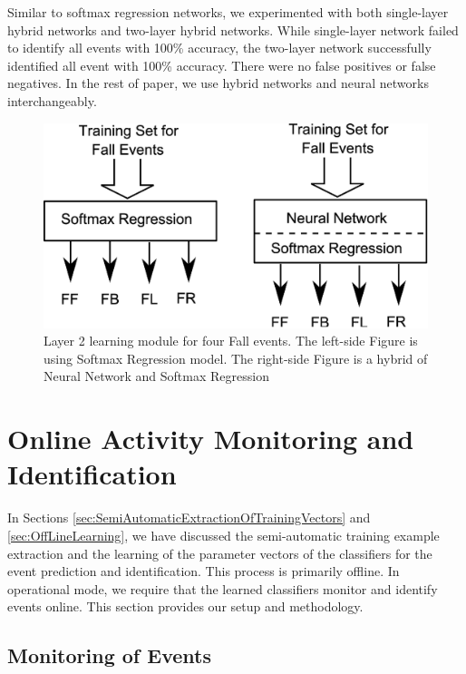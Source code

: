 \documentclass[]{IEEEtran}
\begin{document}
Similar to softmax regression networks, we experimented  with both single-layer
hybrid networks and two-layer hybrid networks. While single-layer network
failed to identify all events with 100\% accuracy, the two-layer network
successfully identified all event with 100\% accuracy. There were no false
positives or false negatives. In the rest of paper, we use hybrid networks and
neural networks interchangeably.

\begin{figure}[t]
	\centering
		\includegraphics[width=0.7\columnwidth]{figures/SoftmaxLayer2Fall.eps}
	\caption{Layer 2 learning module for four Fall events. The left-side
Figure is using Softmax Regression model. The right-side Figure is a hybrid of
Neural Network and Softmax Regression } \label{fig:SoftmaxLayer2Fall}
\end{figure}


\section{Online Activity Monitoring and Identification}

In Sections \ref{sec:SemiAutomaticExtractionOfTrainingVectors} and
\ref{sec:OffLineLearning}, we have discussed the semi-automatic training
example extraction and the learning of the parameter vectors of the classifiers
for the event prediction and identification. This process is primarily offline.
In operational mode, we require that the learned classifiers monitor and
identify events online. This section provides our setup and methodology.  



\subsection{Monitoring of Events}
\end{document}
